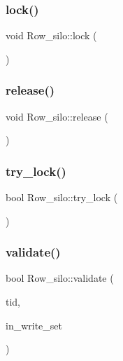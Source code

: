 \mbox{\label{classRow__silo_a914b5cf2fadfb669fc3981f0d4158aa8}} 
\subsubsection{\texorpdfstring{lock()}{lock()}}
{\footnotesize\ttfamily void Row\+\_\+silo\+::lock (\begin{DoxyParamCaption}{ }\end{DoxyParamCaption})}

\mbox{\label{classRow__silo_a6cba9fad4d1594f0372fa2a6e1d75055}} 
\subsubsection{\texorpdfstring{release()}{release()}}
{\footnotesize\ttfamily void Row\+\_\+silo\+::release (\begin{DoxyParamCaption}{ }\end{DoxyParamCaption})}

\mbox{\label{classRow__silo_ae794136e1754f843ddcbf43ed889ed21}} 
\subsubsection{\texorpdfstring{try\+\_\+lock()}{try\_lock()}}
{\footnotesize\ttfamily bool Row\+\_\+silo\+::try\+\_\+lock (\begin{DoxyParamCaption}{ }\end{DoxyParamCaption})}

\mbox{\label{classRow__silo_a8f766da80b217272f1a39cbbded2af62}} 
\subsubsection{\texorpdfstring{validate()}{validate()}}
{\footnotesize\ttfamily bool Row\+\_\+silo\+::validate (\begin{DoxyParamCaption}\item[{\hyperlink{global_8h_aaf095dfc9b10f757c968fe146ad7e724}{ts\+\_\+t}}]{tid,  }\item[{bool}]{in\+\_\+write\+\_\+set }\end{DoxyParamCaption})}

